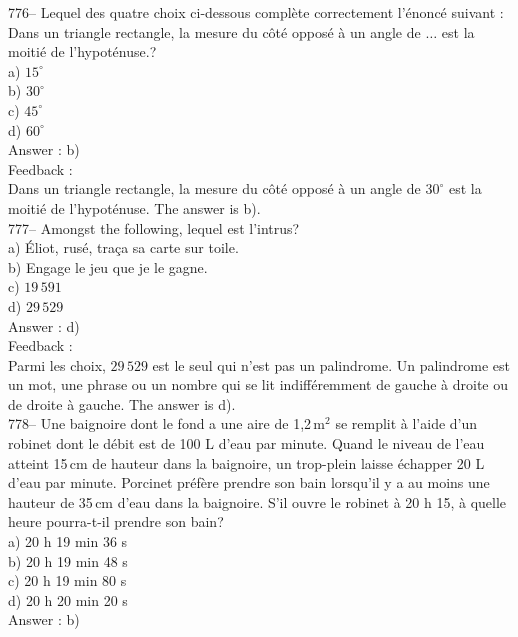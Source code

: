 \documentclass[letterpaper, 12pt]{article}
\begin{document}
776-- Lequel des quatre choix ci-dessous compl\`ete correctement
l'\'enonc\'e suivant : \og Dans un triangle rectangle, la mesure du
c\^ot\'e oppos\'e \`a un angle de $\ldots$ est la moiti\'e de l'hypot\'enuse.\fg ?\\
a) $15^{\circ}$\\
b) $30^{\circ}$\\
c) $45^{\circ}$\\
d) $60^{\circ}$\\

Answer : b)\\

Feedback : \\
Dans un triangle rectangle, la mesure du c\^ot\'e oppos\'e \`a un angle de
$30^{\circ}$ est la moiti\'e de l'hypot\'enuse.  The answer is b).\\


777-- Amongst the following, lequel est l'intrus?\\
a) \'Eliot, rus\'e, tra\c ca sa carte sur toile.\\
b) Engage le jeu que je le gagne.\\
c) $19\,591$\\
d) $29\,529$\\

Answer : d)\\

Feedback : \\
Parmi les choix, $29\,529$ est le seul qui n'est pas un palindrome.  Un
palindrome est un mot, une phrase ou un nombre qui se lit indiff\'eremment
de gauche \`a droite ou de droite \`a gauche.  The answer is d).\\

778-- Une baignoire dont le fond a une aire de 1,2\,m$^{2}$ se remplit \`a
l'aide d'un robinet dont le d\'ebit est de 100 L d'eau par minute.  Quand le
niveau de l'eau atteint 15\,cm de hauteur dans la baignoire, un trop-plein
laisse \'echapper 20 L d'eau par minute.  Porcinet pr\'ef\`ere prendre son
bain lorsqu'il y a au moins une hauteur de 35\,cm d'eau dans la baignoire.
S'il ouvre le robinet \`a 20 h 15, \`a quelle heure pourra-t-il prendre son
bain?\\
a) 20 h 19 min 36 s\\
b) 20 h 19 min 48 s\\
c) 20 h 19 min 80 s\\
d) 20 h 20 min 20 s\\


Answer : b)\\
\end{document}
